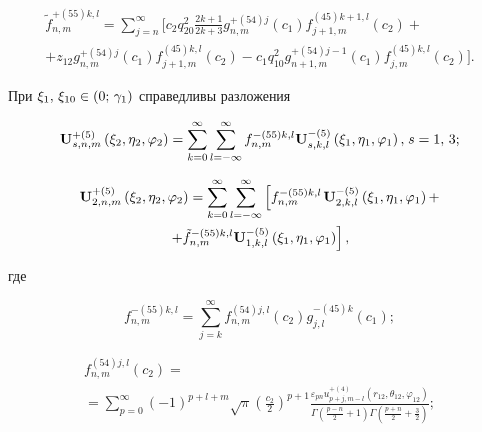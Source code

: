 \begin{russian}
\begin{theorem}
\begin{multline}\label{eq:1:51}
\tilde f_{n,m}^{ + (55)k,l} = \sum\limits_{j = n}^\infty \bigg[ {c_2}q_{20}^2\frac{{2k + 1}}{{2k + 3}}g_{n,m}^{ + (54)j}({c_1})f_{j + 1,m}^{(45)k + 1,l}({c_2}) + \\
+ {z_{12}}g_{n,m}^{ + (54)j}({c_1})f_{j + 1,m}^{(45)k,l}({c_2}) - {{c_1}q_{10}^2g_{n + 1,m}^{ + (54)j - 1}({c_1})f_{j,m}^{(45)k,l}({c_2})} \bigg].
\end{multline}

При ${\xi _1},{\mkern 1mu} {\kern 1pt} {\xi _{10}} \in (0;{\mkern 1mu} {\kern 1pt} {\gamma _1})$ справедливы разложения

\begin{equation}\label{eq:1:52}
{\bf{U}}_{s,n,m}^{ + (5)}\left( {{\xi _2},{\eta _2},{\varphi _2}} \right) = \sum\limits_{k = 0}^\infty  {\sum\limits_{l =  - \infty }^\infty  {f_{n,m}^{ - (55)k,l}} } {\bf{U}}_{s,k,l}^{ - (5)}\left( {{\xi _1},{\eta _1},{\varphi _1}} \right), {\kern 1pt} s = 1,{\mkern 1mu} {\kern 1pt} 3;
\end{equation}

\begin{multline}\label{eq:1:53}
{\bf{U}}_{2,n,m}^{ + (5)}\left( {{\xi _2},{\eta _2},{\varphi _2}} \right) = \sum\limits_{k = 0}^\infty  {\sum\limits_{l =  - \infty }^\infty  {\left[ {f_{n,m}^{ - (55)k,l}} \right.} } {\bf{U}}_{2,k,l}^{ - (5)}\left( {{\xi _1},{\eta _1},{\varphi _1}} \right) + \\
\left. { + \tilde f_{n,m}^{ - (55)k,l}{\bf{U}}_{1,k,l}^{ - (5)}\left( {{\xi _1},{\eta _1},{\varphi _1}} \right)} \right],
\end{multline}

\noindent где

\begin{equation}\label{eq:1:54}
f_{n,m}^{ - (55)k,l} = \sum\limits_{j = k}^\infty  {f_{n,m}^{(54)j,l}({c_2})g_{j,l}^{ - (45)k}} ({c_1});
\end{equation}

\begin{multline}\label{eq:1:55}
f_{n,m}^{(54)j,l}({c_2}) = \\
= \sum\limits_{p = 0}^\infty  {{{( - 1)}^{p + l + m}}} \sqrt \pi  {\left( {\frac{{{c_2}}}{2}} \right)^{p + 1}}\frac{{{\varepsilon _{pn}}u_{p + j,m - l}^{ + (4)}\left( {{r_{12}},{\theta _{12}},{\varphi _{12}}} \right)}}{{\Gamma \left( {\frac{{p - n}}{2} + 1} \right)\Gamma \left( {\frac{{p + n}}{2} + \frac{3}{2}} \right)}};
\end{multline}


\end{theorem}
\end{russian}
